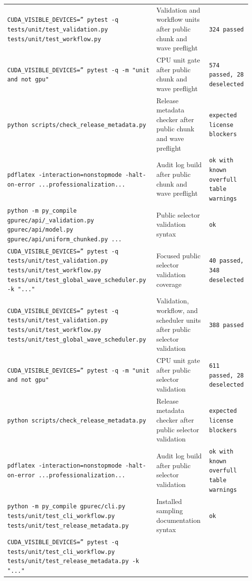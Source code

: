 \documentclass[11pt]{article}
\begin{document}
\begin{center}
\begin{tabular}{lll}
\texttt{CUDA\_VISIBLE\_DEVICES='' pytest -q tests/unit/test\_validation.py tests/unit/test\_workflow.py} &
Validation and workflow units after public chunk and wave preflight &
\texttt{324 passed} \\
\texttt{CUDA\_VISIBLE\_DEVICES='' pytest -q -m "unit and not gpu"} &
CPU unit gate after public chunk and wave preflight &
\texttt{574 passed, 28 deselected} \\
\texttt{python scripts/check\_release\_metadata.py} &
Release metadata checker after public chunk and wave preflight &
\texttt{expected license blockers} \\
\texttt{pdflatex -interaction=nonstopmode -halt-on-error ...professionalization...} &
Audit log build after public chunk and wave preflight &
\texttt{ok with known overfull table warnings} \\
\texttt{python -m py\_compile gpurec/api/\_validation.py gpurec/api/model.py gpurec/api/uniform\_chunked.py ...} &
Public selector validation syntax &
\texttt{ok} \\
\texttt{CUDA\_VISIBLE\_DEVICES='' pytest -q tests/unit/test\_validation.py tests/unit/test\_workflow.py tests/unit/test\_global\_wave\_scheduler.py -k "..."} &
Focused public selector validation coverage &
\texttt{40 passed, 348 deselected} \\
\texttt{CUDA\_VISIBLE\_DEVICES='' pytest -q tests/unit/test\_validation.py tests/unit/test\_workflow.py tests/unit/test\_global\_wave\_scheduler.py} &
Validation, workflow, and scheduler units after public selector validation &
\texttt{388 passed} \\
\texttt{CUDA\_VISIBLE\_DEVICES='' pytest -q -m "unit and not gpu"} &
CPU unit gate after public selector validation &
\texttt{611 passed, 28 deselected} \\
\texttt{python scripts/check\_release\_metadata.py} &
Release metadata checker after public selector validation &
\texttt{expected license blockers} \\
\texttt{pdflatex -interaction=nonstopmode -halt-on-error ...professionalization...} &
Audit log build after public selector validation &
\texttt{ok with known overfull table warnings} \\
\texttt{python -m py\_compile gpurec/cli.py tests/unit/test\_cli\_workflow.py tests/unit/test\_release\_metadata.py} &
Installed sampling documentation syntax &
\texttt{ok} \\
\texttt{CUDA\_VISIBLE\_DEVICES='' pytest -q tests/unit/test\_cli\_workflow.py tests/unit/test\_release\_metadata.py -k "..."} &

\end{tabular}
\end{center}
\end{document}
